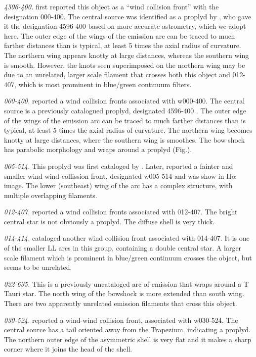 \documentclass[apj, twocolumn]{aastex63}
\newcommand\ha{\ensuremath{\mathrm{H\alpha}}}
\begin{document}
\textit{4596-400.} \citet{Bally:2000a} first reported this object as a
``wind collision front'' with the designation 000-400. The central
source was identified as a proplyd by \citet{Ricci:2008a}, who gave it
the designation 4596-400 based on more accurate astrometry, which we
adopt here. The outer edge of the wings of the emission arc can be
traced to much farther distances than is typical, at least 5 times the
axial radius of curvature. The northern wing appears knotty at large
distances, whereas the southern wing is smooth. However, the knots
seen superimposed on the northern wing may be due to an unrelated,
larger scale filament that crosses both this object and 012-407, which
is most prominent in blue/green continuum filters.

\textit{000-400.} \citet{Bally:2000a} reported a wind collision fronts
associated with w000-400. The central source is a previously catalogued
proplyd, designated 4596-400 \citep{Ricci:2008a}. The outer edge of
the wings of the emission arc can be traced to much farther distances
than is typical, at least 5 times the axial radius of curvature.
The northern wing becomes knotty at large distances, where  the southern
wing is smoothes. The bow shock has parabolic morphology and wraps around
a proplyd (Fig.).   

\textit{005-514.} This proplyd was first cataloged by \citet{ODell:1996a}.
Later, \citet{Bally:2000a} reported a fainter and smaller wind-wind
collission front, designated w005-514 and was show in \ha{} image.
The lower (southeast) wing of the arc has a complex structure, with
multiple overlapping filaments.

\textit{012-407.} \citet{Bally:2000a} reported a wind collision fronts
associated with 012-407. The bright central star is not obviously a
proplyd. The diffuse shell is very thick.  

\textit{014-414.} \citet{Bally:2000a} cataloged another wind collision
front associated with 014-407. It is one of the smaller LL arcs in this
group, containing a double central star. A larger scale filament which
is prominent in blue/green continuum crosses the object, but seems to be
unrelated. 

\textit{022-635.} This is a previously uncataloged arc of emission that
wraps around a T Tauri star. The north wing of the bowshock is more
extended than south wing. There are two apparently unrelated emission
filaments that cross this object. 

\textit{030-524.} \citet{Bally:2000a} reported a wind-wind collision front,
associated with w030-524. The central source has a tail oriented away from
the Trapezium, indicating a proplyd. The northern outer edge of the
asymmetric shell is very flat and it makes a sharp corner where it joins
the head of the shell.
\end{document}
